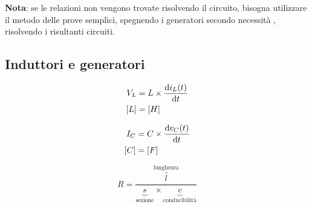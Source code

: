 \documentclass[10pt]{article}
\begin{document}
        \medskip

        \textbf{Nota}: se le relazioni non vengono trovate risolvendo il circuito, bisogna utilizzare il metodo delle
        prove semplici, spegnendo i generatori secondo necessità , risolvendo i risultanti circuiti.

    \subsection*{Induttori e generatori}

        \begin{minipage}[t]{.03\textwidth}
            \vspace{-\baselineskip}
            
            

        \end{minipage}
        \hfill
        \begin{minipage}[t]{.2\textwidth}
            \vspace{-\baselineskip}
            
            \begin{align*}
                V_L &= L \times \dv{i_L (t)}{t}\\
                [L] &= [H]
            \end{align*}

        \end{minipage}
        \hfill
        \begin{minipage}[t]{.03\textwidth}
            \vspace{-\baselineskip}
            
            

        \end{minipage}
        \hfill
        \begin{minipage}[t]{.2\textwidth}
            \vspace{-\baselineskip}
            
            \begin{align*}
                I_C &= C \times \dv{v_C (t)}{t}\\
                [C] &= [F]
            \end{align*}

        \end{minipage}
        \hfill
        \begin{minipage}[t]{.2\textwidth}
            \vspace{-\baselineskip}
            
            \[
                R = \frac{\overbrace{l}^{\text{lunghezza}}}{\underbrace{s}_{\text{sezione}} \times \underbrace{c}_{\text{conducibilità}}}
            \]

        \end{minipage}
\end{document}

